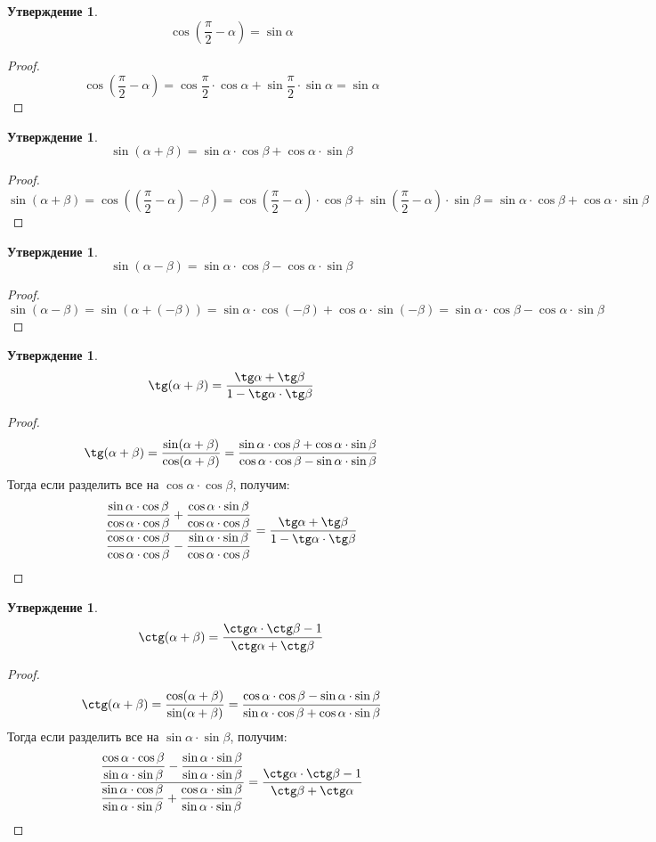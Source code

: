 \documentclass[12pt]{article}
\theoremstyle{definition}
\newtheorem{statement}[theorem]{Утверждение}
\begin{document}
    \begin{statement}
        $$\cos\left(\dfrac{\pi}{2}-\alpha\right)=\sin \alpha$$
    \end{statement}
    \begin{proof}
        $$\cos\left(\dfrac{\pi}{2}-\alpha\right)=\cos\dfrac{\pi}{2}\cdot\cos\alpha+\sin\dfrac{\pi}{2}\cdot\sin\alpha=\sin\alpha$$
    \end{proof}
    \begin{statement}
        $$\sin(\alpha+\beta)=\sin\alpha\cdot\cos\beta+\cos\alpha\cdot\sin\beta$$
    \end{statement}
    \begin{proof}
        $$\sin(\alpha+\beta)=\cos\left(\left(\dfrac{\pi}{2}-\alpha\right)-\beta\right)=\cos\left(\dfrac{\pi}{2}-\alpha\right)\cdot \cos \beta+\sin\left(\dfrac{\pi}{2}-\alpha\right)\cdot \sin \beta=\sin\alpha\cdot\cos\beta+\cos\alpha\cdot\sin\beta$$
    \end{proof}
    \begin{statement}
        $$\sin(\alpha-\beta)=\sin\alpha\cdot\cos\beta-\cos\alpha\cdot\sin\beta$$
    \end{statement}
    \begin{proof}
        $$\sin(\alpha-\beta)=\sin(\alpha+(-\beta))=\sin\alpha\cdot\cos(-\beta)+\cos\alpha\cdot\sin(-\beta)=\sin\alpha\cdot\cos\beta-\cos\alpha\cdot\sin\beta$$
    \end{proof}
    \begin{statement}
        $$\tg(\alpha+\beta)=\dfrac{\tg\alpha+\tg\beta}{1-\tg\alpha\cdot\tg\beta}$$
    \end{statement}
    \begin{proof}
        $$\tg(\alpha+\beta)=\dfrac{\sin(\alpha+\beta)}{\cos(\alpha+\beta)}=\dfrac{\sin\alpha\cdot\cos\beta+\cos\alpha\cdot\sin\beta}{\cos\alpha\cdot\cos\beta-\sin\alpha\cdot\sin\beta}$$
        Тогда если разделить все на $\cos\alpha\cdot\cos\beta$, получим:
        $$\dfrac{\dfrac{\sin\alpha\cdot\cos\beta}{\cos\alpha\cdot\cos\beta}+\dfrac{\cos\alpha\cdot\sin\beta}{\cos\alpha\cdot\cos\beta}}{\dfrac{\cos\alpha\cdot\cos\beta}{\cos\alpha\cdot\cos\beta}-\dfrac{\sin\alpha\cdot\sin\beta}{\cos\alpha\cdot\cos\beta}}=\dfrac{\tg\alpha+\tg\beta}{1-\tg\alpha\cdot\tg\beta}$$
    \end{proof}
    \begin{statement}
        $$\ctg(\alpha+\beta)=\dfrac{\ctg\alpha\cdot\ctg\beta-1}{\ctg\alpha+\ctg\beta}$$
    \end{statement}
    \begin{proof}
        $$\ctg(\alpha+\beta)=\dfrac{\cos(\alpha+\beta)}{\sin(\alpha+\beta)}=\dfrac{\cos\alpha\cdot\cos\beta-\sin\alpha\cdot\sin\beta}{\sin\alpha\cdot\cos\beta+\cos\alpha\cdot\sin\beta}$$
        Тогда если разделить все на $\sin\alpha\cdot\sin\beta$, получим:
        $$\dfrac{\dfrac{\cos\alpha\cdot\cos\beta}{\sin\alpha\cdot\sin\beta}-\dfrac{\sin\alpha\cdot\sin\beta}{\sin\alpha\cdot\sin\beta}}{\dfrac{\sin\alpha\cdot\cos\beta}{\sin\alpha\cdot\sin\beta}+\dfrac{\cos\alpha\cdot\sin\beta}{\sin\alpha\cdot\sin\beta}}=\dfrac{\ctg\alpha\cdot\ctg\beta-1}{\ctg\beta+\ctg\alpha}$$
    \end{proof}
\end{document}
